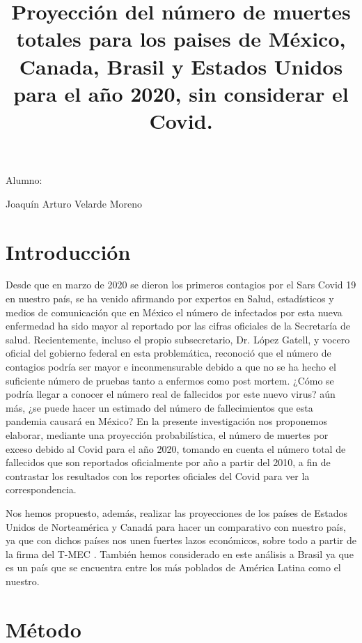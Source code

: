 \documentclass[12pt]{article}
\title{Proyección del número de muertes totales para los paises de México, Canada, Brasil y Estados Unidos para el año 2020, sin considerar el Covid.}
\date{}
\begin{document}
	\maketitle
	\begin{center}


\textbf{ }

\centerline{Alumno: } 
\centerline{Joaquín Arturo Velarde Moreno}


	\end{center}

\section{Introducción}
Desde que en marzo de 2020 se dieron los primeros contagios por el Sars Covid 19 en nuestro país, se ha venido afirmando por expertos en Salud, estadísticos y medios de comunicación que en México el número de infectados por esta nueva enfermedad ha sido mayor al reportado por las cifras oficiales de la Secretaría de salud. Recientemente, incluso el propio subsecretario, Dr. López Gatell, y vocero oficial del gobierno federal en esta problemática, reconoció que el número de contagios podría ser mayor e inconmensurable debido a que no se ha hecho el suficiente número de pruebas tanto a enfermos como post mortem.
¿Cómo se podría llegar a conocer el número real de fallecidos por este nuevo virus? aún más, ¿se puede hacer un estimado del número de fallecimientos que esta pandemia causará en México? 
En la presente investigación nos proponemos elaborar, mediante una proyección probabilística, el número de muertes por exceso debido al Covid para el año 2020, tomando en cuenta el número total de fallecidos que son reportados oficialmente por año a partir del 2010, a fin de contrastar los resultados con los reportes oficiales del Covid para ver la correspondencia.

Nos hemos propuesto, además, realizar las proyecciones de los países de Estados Unidos de Norteamérica y Canadá para hacer un comparativo con nuestro país, ya que con dichos países nos unen fuertes lazos económicos, sobre todo a partir de la firma del T-MEC \cite{MEC}.  
También hemos considerado en este análisis a Brasil ya que es un país que se encuentra entre los más poblados de América Latina como el nuestro. 

\section{Método}
\end{document}
